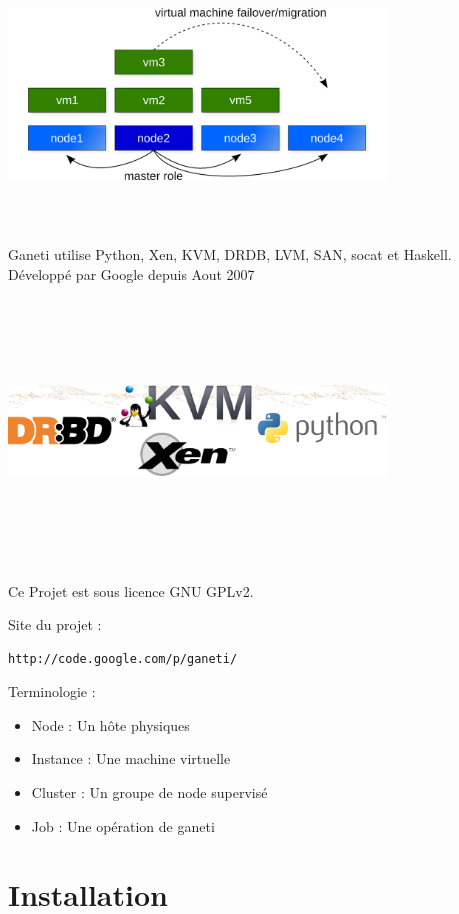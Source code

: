 \includegraphics[width=10cm,height=7cm]{images/principe_ganeti.png}


Ganeti utilise Python, Xen, KVM, DRDB, LVM, SAN, socat et Haskell.
Développé par Google depuis Aout 2007

\includegraphics[width=10cm,height=7cm]{images/image1.png}

Ce Projet est sous licence GNU GPLv2.

Site du projet :
\begin{lstlisting}
http://code.google.com/p/ganeti/
\end{lstlisting}

Terminologie :
\begin{itemize}
\item Node : Un hôte physiques
\item Instance : Une machine virtuelle
\item Cluster : Un groupe de node supervisé
\item Job : Une opération de ganeti
\end{itemize}

\section {Installation}
